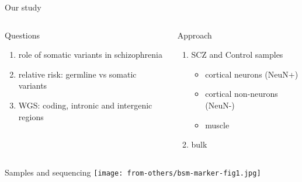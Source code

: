 \documentclass{beamer}
\begin{document}
\begin{frame}{Our study}
\begin{columns}[t]
\begin{column}{0.5\textwidth}
Questions
\begin{enumerate}
\item role of somatic variants in schizophrenia
\item relative risk: germline vs somatic variants	
\item WGS: coding, intronic and intergenic regions
\end{enumerate}
\end{column}

\begin{column}{0.5\textwidth}
Approach
\begin{enumerate}
\item SCZ and Control samples
	\begin{itemize}
		\item cortical neurons (NeuN+)
                \item cortical non-neurons (NeuN-)
                \item muscle
	\end{itemize}
\item bulk
\end{enumerate}
\end{column}
\end{columns}
\end{frame}


\begin{frame}{Samples and sequencing}
\texttt{[image: from-others/bsm-marker-fig1.jpg]}
\end{frame}
\end{document}
